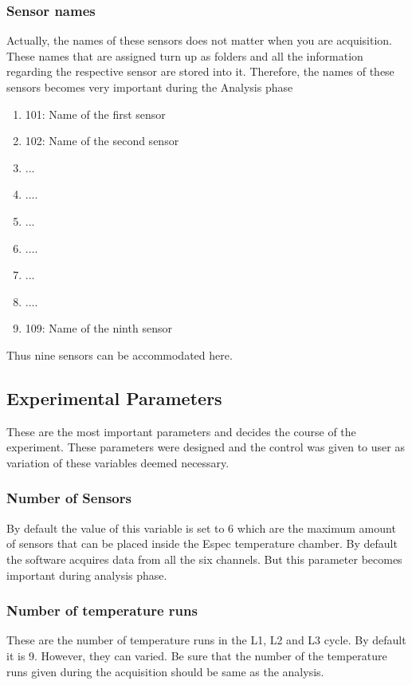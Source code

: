 \documentclass[12pt]{article}
\begin{document}
    
    
    \subsubsection{Sensor names}
    Actually, the names of these sensors does not matter when you are acquisition. These names that are assigned turn up as folders and all the information regarding the respective sensor are stored into it. Therefore, the names of these sensors becomes very important during the Analysis phase 
    \begin{enumerate}
        \item 101: Name of the first sensor
        \item 102: Name of the second sensor
        \item ...
        \item ....
        \item ...
        \item ....
        \item ...
        \item ....
        \item 109: Name of the ninth sensor
    \end{enumerate}
    Thus nine sensors can be accommodated here.
    
\subsection{Experimental Parameters}
These are the most important parameters and decides the course of the experiment. These parameters were designed and the control was given to user as variation of these variables deemed necessary.

    \subsubsection{Number of Sensors}
    By default the value of this variable is set to 6 which are the maximum amount of sensors that can be placed inside the Espec temperature chamber. By default the software acquires data from all the six channels. But this parameter becomes important during analysis phase. 
    
    \subsubsection{Number of temperature runs}
    These are the number of temperature runs in the L1, L2 and L3 cycle. By default it is 9. However, they can varied. Be sure that the number of the temperature runs given during the acquisition should be same as the analysis.
    
\end{document}

